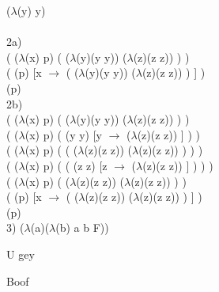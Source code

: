 \documentclass[12pt]{article}
\begin{document}
\noindent($\lambda$(y) y)\\

\hrulefill \\

\noindent 2a)\\
( ($\lambda$(x) p) ( ($\lambda$(y)(y y)) ($\lambda$(z)(z z)) ) )\\
( (p) [x $\to$ ( ($\lambda$(y)(y y)) ($\lambda$(z)(z z)) ) ] )\\
(p)\\


\noindent 2b)\\
\noindent( ($\lambda$(x) p) ( ($\lambda$(y)(y y)) ($\lambda$(z)(z z)) ) )\\
( ($\lambda$(x) p) ( (y y) [y $\to$ ($\lambda$(z)(z z)) ] ) )\\

\noindent( ($\lambda$(x) p) ( ( ($\lambda$(z)(z z)) ($\lambda$(z)(z z)) ) ) )\\
( ($\lambda$(x) p) ( ( (z z) [z $\to$ ($\lambda$(z)(z z)) ] ) ) )\\

\noindent( ($\lambda$(x) p) ( ($\lambda$(z)(z z)) ($\lambda$(z)(z z)) ) )\\
( (p) [x $\to$ ( ($\lambda$(z)(z z)) ($\lambda$(z)(z z)) ) ] )\\
(p)\\


3) ($\lambda$(a)($\lambda$(b) a b F))

\pagebreak 

\begin{algorithm}[H]
\caption{U gey}
\begin{algorithmic}
\State Boof
\end{algorithmic}
\end{algorithm}
\end{document}
